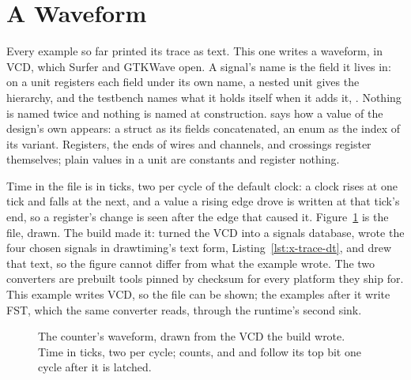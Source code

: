 \section{A Waveform}
\label{sec:x-trace}

Every example so far printed its trace as text. This one writes a
waveform, in VCD, which Surfer and GTKWave open. A signal's name is
the field it lives in:  on a unit registers
each field under its own name, a nested unit gives the hierarchy, and
the testbench names what it holds itself when it adds it,
. Nothing is named twice and nothing is
named at construction.  says how a value of
the design's own appears: a struct as its fields concatenated, an enum
as the index of its variant. Registers, the ends of wires and
channels, and crossings register themselves; plain values in a unit
are constants and register nothing.

Time in the file is in ticks, two per cycle of the default clock: a
clock rises at one tick and falls at the next, and a value a rising
edge drove is written at that tick's end, so a register's change is
seen after the edge that caused it. Figure~\ref{fig:x-trace} is the
file, drawn. The build made it:
 turned the VCD into a signals database,
 wrote the four chosen signals in drawtiming's
text form, Listing~\ref{lst:x-trace-dt}, and 
drew that text, so the figure cannot differ from what the example
wrote. The two converters are prebuilt tools pinned by checksum for
every platform they ship for. This example writes VCD, so the file can
be shown; the examples after it write FST, which the same converter
reads, through the runtime's second sink.

\begin{figure}[htbp]
\centering

\caption{The counter's waveform, drawn from the VCD the build wrote.
Time in ticks, two per cycle;  counts, and  and
 follow its top bit one cycle after it is latched.}
\label{fig:x-trace}
\end{figure}




